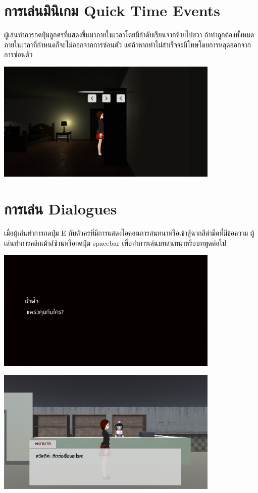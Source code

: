 \section*{การเล่นมินิเกม Quick Time Events}
ผู้เล่นทำการกดปุ่มลูกศรที่แสดงขึ้นมาภายในเวลาโดยมีลำดับเรียนจากซ้ายไปขวา ถ้าทำถูกต้องทั้งหมดภายในเวลาที่กำหนดก็จะไม่ออกจากการซ่อนตัว แต่ถ้าหากทำไม่สำเร็จจะมีโทษโดยการหลุดออกจากการซ่อนตัว
\begin{center}
    \includegraphics[width=0.8\textwidth, height=0.25\textheight]{Images/QuickTimeEvent.png}
\end{center}

\section*{การเล่น Dialogues}
เมื่อผู้เล่นทำการกดปุ่ม E กับตัวครที่มีการแสดงไอคอนการสนทนาหรือเข้าสู้ฉากสีดำมืดที่มีข้อความ ผู้เล่นทำการคลิกเม้าส์ซ้านหรือกดปุ่ม spacebar เพื่อทำการเล่นบทสนทนาหรือบทพูดต่อไป
\begin{center}
    \includegraphics[width=0.8\textwidth, height=0.25\textheight]{Images/Dialogue Cutscene.png}
\end{center}
\begin{center}
    \includegraphics[width=0.8\textwidth, height=0.25\textheight]{Images/Dialogue manage.png}
\end{center}

